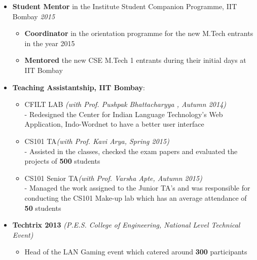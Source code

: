 \begin{itemize}
	\item \textbf{Student Mentor} in the Institute Student Companion Programme, IIT Bombay \hfill \emph{2015} \\[-0.6cm]
	\begin{itemize}
		\item \textbf{Coordinator} in the orientation programme for the new M.Tech entrants in the year 2015 \\[-0.6cm]
		\item \textbf{Mentored} the new CSE M.Tech 1 entrants during their initial days at IIT Bombay \\[-0.6cm]
	\end{itemize}
	\item \textbf{Teaching Assistantship, IIT Bombay}: \hfill \\[-0.6cm]
	\begin{itemize}
		\item CFILT LAB \hfill \emph{(with Prof. Pushpak Bhattacharyya , Autumn 2014)} \\[0.05cm]
- Redesigned the Center for Indian Language Technology's Web Application, Indo-Wordnet to have a better user interface \\[-0.5cm]
		\item CS101 TA\hfill \emph{(with Prof. Kavi Arya, Spring 2015)} \\[0.05cm]
- Assisted in the classes, checked the exam papers and evaluated the projects of \textbf{500} students \\[-0.5cm]
		\item CS101 Senior TA\hfill \emph{(with Prof. Varsha Apte, Autumn 2015)} \\[0.05cm]
- Managed the work assigned to the Junior TA's and was responsible for conducting the CS101 Make-up lab which has an average attendance of \textbf{50} students \\[-0.5cm]
	\end{itemize}
	\item \textbf{Techtrix 2013} \hfill \emph{(P.E.S. College of Engineering, National Level Technical Event)} \\[-0.6cm]
	\begin{itemize}
		\item Head of the LAN Gaming event which catered around \textbf{300} participants \\[-0.4cm]
	\end{itemize}
\end{itemize}
